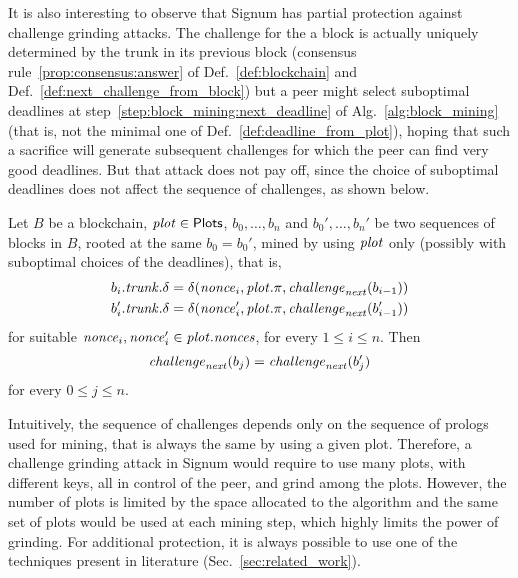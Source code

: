 It is also interesting to observe that Signum has partial protection
against challenge grinding attacks.
The challenge for the a block is actually uniquely determined by the trunk in its
previous block
(consensus rule~\ref{prop:consensus:answer} of Def.~\ref{def:blockchain}
and Def.~\ref{def:next_challenge_from_block}) but a peer
might select suboptimal deadlines at step~\ref{step:block_mining:next_deadline}
of Alg.~\ref{alg:block_mining} (that is, not the minimal one of Def.~\ref{def:deadline_from_plot}),
hoping that such a sacrifice will generate subsequent challenges for which the peer
can find very good deadlines.
But that attack does not pay off, since the choice of suboptimal deadlines does not
affect the sequence of challenges, as shown below.
%
\begin{proposition}\label{prop:no_challenge_grinding}
  Let $B$ be a blockchain, ${\mathit{plot}}\in{\mathsf{Plots}}$, $b_0,\ldots,b_n$ and
  $b_0',\ldots,b_n'$ be two sequences of blocks in $B$, rooted at the same
  $b_0=b_0'$, mined by using ${\mathit{plot}}$ only
  (possibly with suboptimal choices of the deadlines), that is,
  \begin{align*}
    b_i.{\mathit{trunk}}.\delta&=\delta({\mathit{nonce}}_i,{\mathit{plot}}.\pi,{\mathit{challenge}}_{\mathit{next}}(b_{i-1}))\\
    b'_i.{\mathit{trunk}}.\delta&=\delta({\mathit{nonce}}'_i,{\mathit{plot}}.\pi,{\mathit{challenge}}_{\mathit{next}}(b'_{i-1}))
  \end{align*}
  for suitable ${\mathit{nonce}}_i,{\mathit{nonce}}_i'\in{\mathit{plot}}.{\mathit{nonces}}$, for every $1\le i\le n$. Then
  \[
  {\mathit{challenge}}_{\mathit{next}}(b_j)={\mathit{challenge}}_{\mathit{next}}(b'_j)
  \]
  for every $0\le j\le n$.
\end{proposition}
%
Intuitively, the sequence of challenges depends only on
the sequence of prologs used for mining, that is always the same by using a given plot.
Therefore, a challenge grinding attack in Signum
would require to use many plots, with different keys, all in control of the peer,
and grind among the plots. However, the number of plots is limited by the space
allocated to the algorithm and the same set of plots
would be used at each mining step, which highly
limits the power of grinding. For additional protection, it is always possible to use
one of the techniques present in literature (Sec.~\ref{sec:related_work}).
